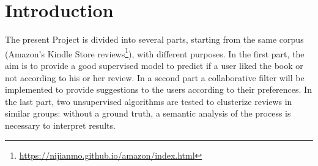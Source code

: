 \documentclass[fleqn,10pt]{SelfArx}
\begin{document}
\flushbottom %

\maketitle
\tableofcontents
\newpage

\thispagestyle{empty} %


\section*{Introduction}

The present Project is divided into several parts, starting from the same corpus (Amazon's Kindle Store reviews\footnote{\url{https://nijianmo.github.io/amazon/index.html}}), with different purposes.
In the first part, the aim is to provide a good supervised model to predict if a user liked the book or not according to his or her review.
In a second part a collaborative filter will be implemented to provide suggestions to the users according to their preferences.
In the last part, two unsupervised algorithms are tested to clusterize reviews in similar groups: without a ground truth, a semantic analysis of the process is necessary to interpret results.
\end{document}
